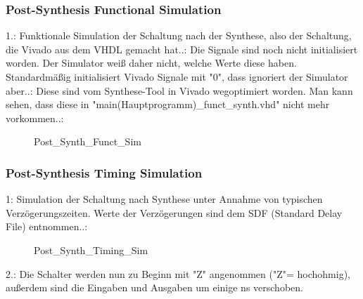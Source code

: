 \documentclass{article}
\begin{document}
\subsubsection{Post-Synthesis Functional Simulation}
1.: \newline
Funktionale Simulation der Schaltung nach der Synthese, also der Schaltung, die Vivado aus dem VHDL gemacht hat..:\newline
Die Signale sind noch nicht initialisiert worden. Der Simulator weiß daher nicht, welche Werte diese haben. Standardm\"a{\ss}ig initialisiert Vivado Signale mit "0", dass ignoriert der Simulator aber..:\newline
Diese sind vom Synthese-Tool in Vivado wegoptimiert worden. Man kann sehen, dass diese in "main(Hauptprogramm)\_funct\_synth.vhd" nicht mehr vorkommen..:\newline
\begin{figure}[H]
\begin{center}
\caption{Post\_Synth\_Funct\_Sim}
\end{center}
\end{figure}

\subsubsection{Post-Synthesis Timing Simulation}
1:\newline
Simulation der Schaltung nach Synthese unter Annahme von typischen Verz\"ogerungszeiten. Werte der Verz\"ogerungen sind dem SDF (Standard Delay File) entnommen.\citep{SDF}.:\newline
\begin{figure}[H]
\begin{center}
\caption{Post\_Synth\_Timing\_Sim}
\end{center}
\end{figure}
2.:\newline
Die Schalter werden nun zu Beginn mit "Z" angenommen ("Z"= hochohmig), au{\ss}erdem sind die Eingaben und Ausgaben um einige ns verschoben.
\end{document}
